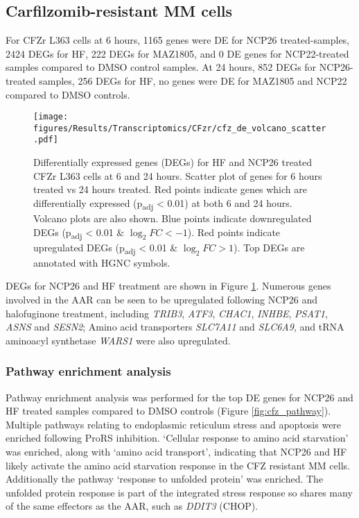 
\afterpage{\clearpage}
\subsection{Carfilzomib-resistant MM cells}

For CFZr L363 cells at 6 hours, 1165 genes were DE for NCP26 treated-samples, 2424 DEGs for HF, 222 DEGs for MAZ1805, and 0 DE genes for NCP22-treated samples compared to DMSO control samples.
At 24 hours, 852 DEGs for NCP26-treated samples, 256 DEGs for HF, no genes were DE for MAZ1805 and NCP22 compared to DMSO controls.
%
\begin{figure}[bht]
\centering
\texttt{[image: figures/Results/Transcriptomics/CFzr/cfz\_de\_volcano\_scatter.pdf]}
\caption[Differentially expressed genes- CFZr cells]{Differentially expressed genes (DEGs) for HF and NCP26 treated CFZr L363 cells at 6 and 24 hours.
Scatter plot of genes for 6 hours treated vs 24 hours treated.
Red points indicate genes which are differentially expressed (p\textsubscript{adj} < 0.01) at both 6 and 24 hours.
Volcano plots are also shown.
Blue points indicate downregulated DEGs (p\textsubscript{adj} < 0.01 \& $\log_{2}FC < -1$).
Red points indicate upregulated DEGs (p\textsubscript{adj} < 0.01 \& $\log_{2}FC > 1$).
Top DEGs are annotated with HGNC symbols.
}
\label{fig:cfz_de}
\end{figure}
DEGs for NCP26 and HF treatment are shown in Figure \ref{fig:cfz_de}.
Numerous genes involved in the AAR can be seen to be upregulated following NCP26 and halofuginone treatment, including \textit{TRIB3}, \textit{ATF3}, \textit{CHAC1}, \textit{INHBE}, \textit{PSAT1}, \textit{ASNS} and \textit{SESN2};
Amino acid transporters \textit{SLC7A11} and \textit{SLC6A9}, and tRNA aminoacyl synthetase \textit{WARS1} were also upregulated.

\subsubsection{Pathway enrichment analysis}
Pathway enrichment analysis was performed for the top DE genes for NCP26 and HF treated samples compared to DMSO controls (Figure \ref{fig:cfz_pathway}).
Multiple pathways relating to endoplasmic reticulum stress and apoptosis were enriched following ProRS inhibition.
`Cellular response to amino acid starvation' was enriched, along with `amino acid transport', indicating that NCP26 and HF likely activate the amino acid starvation response in the CFZ resistant MM cells.
Additionally the pathway `response to unfolded protein' was enriched.
The unfolded protein response is part of the integrated stress response so shares many of the same effectors as the AAR, such as \textit{DDIT3} (CHOP).

